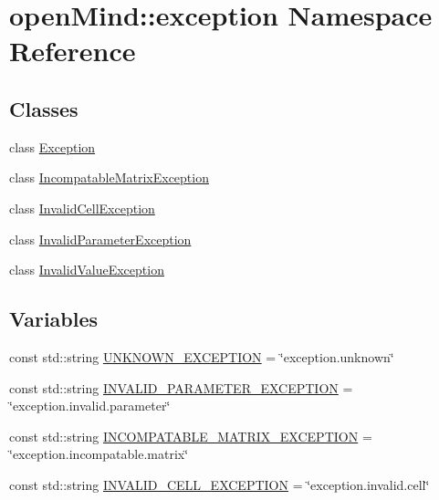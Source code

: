 \hypertarget{namespaceopen_mind_1_1exception}{\section{open\+Mind\+:\+:exception Namespace Reference}
\label{namespaceopen_mind_1_1exception}
}
\subsection*{Classes}
\begin{DoxyCompactItemize}
\item 
class \hyperlink{classopen_mind_1_1exception_1_1_exception}{Exception}
\item 
class \hyperlink{classopen_mind_1_1exception_1_1_incompatable_matrix_exception}{Incompatable\+Matrix\+Exception}
\item 
class \hyperlink{classopen_mind_1_1exception_1_1_invalid_cell_exception}{Invalid\+Cell\+Exception}
\item 
class \hyperlink{classopen_mind_1_1exception_1_1_invalid_parameter_exception}{Invalid\+Parameter\+Exception}
\item 
class \hyperlink{classopen_mind_1_1exception_1_1_invalid_value_exception}{Invalid\+Value\+Exception}
\end{DoxyCompactItemize}
\subsection*{Variables}
\begin{DoxyCompactItemize}
\item 
const std\+::string \hyperlink{namespaceopen_mind_1_1exception_adefb0fe43f83e80ef7990dde88371f74}{U\+N\+K\+N\+O\+W\+N\+\_\+\+E\+X\+C\+E\+P\+T\+I\+O\+N} = \char`\"{}exception.\+unknown\char`\"{}
\item 
const std\+::string \hyperlink{namespaceopen_mind_1_1exception_a70369affdee2d4f69c7bcafba476bdd9}{I\+N\+V\+A\+L\+I\+D\+\_\+\+P\+A\+R\+A\+M\+E\+T\+E\+R\+\_\+\+E\+X\+C\+E\+P\+T\+I\+O\+N} = \char`\"{}exception.\+invalid.\+parameter\char`\"{}
\item 
const std\+::string \hyperlink{namespaceopen_mind_1_1exception_ad967966e290543fd2669301d9ad258a2}{I\+N\+C\+O\+M\+P\+A\+T\+A\+B\+L\+E\+\_\+\+M\+A\+T\+R\+I\+X\+\_\+\+E\+X\+C\+E\+P\+T\+I\+O\+N} = \char`\"{}exception.\+incompatable.\+matrix\char`\"{}
\item 
const std\+::string \hyperlink{namespaceopen_mind_1_1exception_a036631ed194e5d882b70c2d3a0c50f29}{I\+N\+V\+A\+L\+I\+D\+\_\+\+C\+E\+L\+L\+\_\+\+E\+X\+C\+E\+P\+T\+I\+O\+N} = \char`\"{}exception.\+invalid.\+cell\char`\"{}
\end{DoxyCompactItemize}


